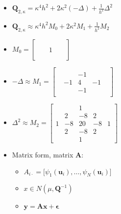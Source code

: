 \documentclass{article}
\begin{document}
\begin{itemize}
\item $\pmb{Q}_{2, \kappa} = \kappa^{4} h^{2} + 2 \kappa^{2}(-\Delta) + \frac{1}{h^{2}} \Delta^{2}$
\item $\pmb{Q}_{2, \kappa} \approx \kappa^{4} h^{2} M_{0} + 2 \kappa^{2} M_{1} + \frac{1}{h^{2}} M_{2}$

\item $M_{0} =
        \begin{bmatrix}
        &    &   &    &     \\
        &   &  &   &     \\
        &  & 1 &  &    \\
        &   &  &   &     \\
        &   &   &    &
        \end{bmatrix}
     $
\item     $-\Delta \approx M_{1} =
        \begin{bmatrix}
        &    &  &    &     \\
        &   & -1 &   &     \\
       & -1 & 4 & -1 &    \\
        &   & -1 &   &     \\
        &    &   &    &
     \end{bmatrix} $


\item $ \Delta^{2} \approx M_{2} =
        \begin{bmatrix}
        &    & 1  &    &     \\
        & 2  & -8 & 2  &     \\
      1 & -8 & 20 & -8 & 1   \\
        & 2  & -8 & 2  &     \\
        &    & 1  &    &
     \end{bmatrix} $

\item Matrix form, matrix $\pmb{A}$:
  \begin{itemize}
  \item $ A_{i \cdot} = \big[ \psi_{1} (\pmb{u}_{i}), \dots, \psi_{N}(\pmb{u}_{i}) \big] $
  \item $x \in N(\mu, \pmb{Q}^{-1})$
  \item $\pmb{y} = \pmb{Ax} + \pmb{\epsilon}$
  \end{itemize}

\end{itemize}
\end{document}
